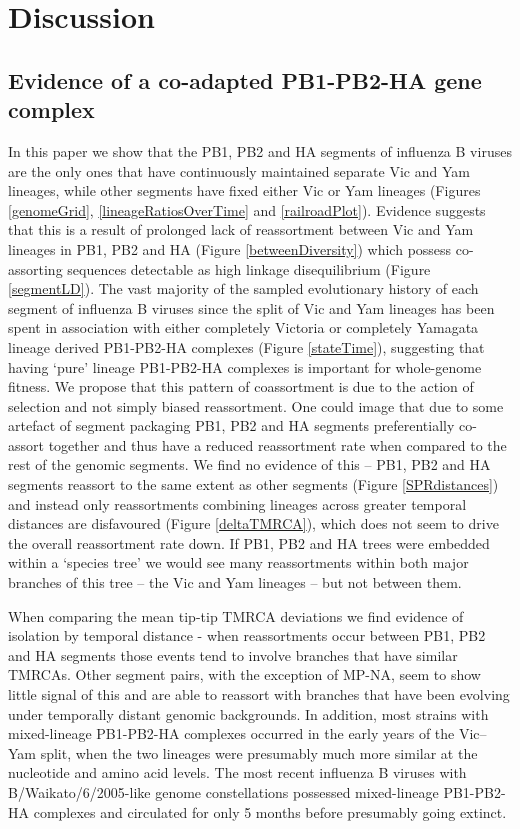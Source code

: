 \documentclass[11pt,oneside,letterpaper]{article}
\begin{document}
\section*{Discussion}

\subsection*{Evidence of a co-adapted PB1-PB2-HA gene complex}
In this paper we show that the PB1, PB2 and HA segments of influenza B viruses are the only ones that have continuously maintained separate Vic and Yam lineages, while other segments have fixed either Vic or Yam lineages (Figures \ref{genomeGrid}, \ref{lineageRatiosOverTime} and \ref{railroadPlot}).
Evidence suggests that this is a result of prolonged lack of reassortment between Vic and Yam lineages in PB1, PB2 and HA (Figure \ref{betweenDiversity}) which possess co-assorting sequences detectable as high linkage disequilibrium (Figure \ref{segmentLD}).
The vast majority of the sampled evolutionary history of each segment of influenza B viruses since the split of Vic and Yam lineages has been spent in association with either completely Victoria or completely Yamagata lineage derived PB1-PB2-HA complexes (Figure \ref{stateTime}), suggesting that having `pure' lineage PB1-PB2-HA complexes is important for whole-genome fitness.
We propose that this pattern of coassortment is due to the action of selection and not simply biased reassortment.
One could image that due to some artefact of segment packaging PB1, PB2 and HA segments preferentially co-assort together and thus have a reduced reassortment rate when compared to the rest of the genomic segments.
We find no evidence of this -- PB1, PB2 and HA segments reassort to the same extent as other segments (Figure \ref{SPRdistances}) and instead only reassortments combining lineages across greater temporal distances are disfavoured (Figure \ref{deltaTMRCA}), which does not seem to drive the overall reassortment rate down.
If PB1, PB2 and HA trees were embedded within a `species tree' we would see many reassortments within both major branches of this tree -- the Vic and Yam lineages -- but not between them.

When comparing the mean tip-tip TMRCA deviations we find evidence of isolation by temporal distance - when reassortments occur between PB1, PB2 and HA segments those events tend to involve branches that have similar TMRCAs.
Other segment pairs, with the exception of MP-NA, seem to show little signal of this and are able to reassort with branches that have been evolving under temporally distant genomic backgrounds.
In addition, most strains with mixed-lineage PB1-PB2-HA complexes occurred in the early years of the Vic--Yam split, when the two lineages were presumably much more similar at the nucleotide and amino acid levels.
The most recent influenza B viruses with B/Waikato/6/2005-like genome constellations possessed mixed-lineage PB1-PB2-HA complexes and circulated for only 5 months before presumably going extinct.
\end{document}
